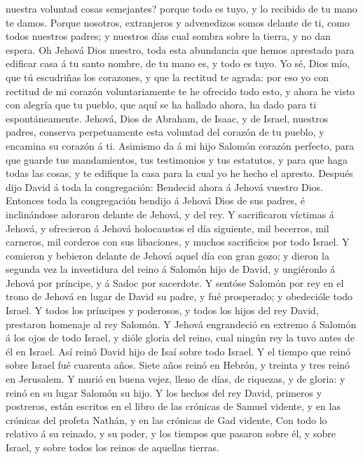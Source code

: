 nuestra voluntad cosas semejantes? porque todo es tuyo, y lo recibido de
tu mano te damos.  Porque nosotros, extranjeros y
advenedizos somos delante de ti, como todos nuestros padres; y nuestros
días cual sombra sobre la tierra, y no dan espera.  Oh
Jehová Dios nuestro, toda esta abundancia que hemos aprestado para
edificar casa á tu santo nombre, de tu mano es, y todo es tuyo.
 Yo sé, Dios mío, que tú escudriñas los corazones, y que
la rectitud te agrada: por eso yo con rectitud de mi corazón
voluntariamente te he ofrecido todo esto, y ahora he visto con alegría
que tu pueblo, que aquí se ha hallado ahora, ha dado para ti
espontáneamente.  Jehová, Dios de Abraham, de Isaac, y de
Israel, nuestros padres, conserva perpetuamente esta voluntad del
corazón de tu pueblo, y encamina su corazón á ti. 
Asimismo da á mi hijo Salomón corazón perfecto, para que guarde tus
mandamientos, tus testimonios y tus estatutos, y para que haga todas las
cosas, y te edifique la casa para la cual yo he hecho el apresto.
 Después dijo David á toda la congregación: Bendecid
ahora á Jehová vuestro Dios. Entonces toda la congregación bendijo á
Jehová Dios de sus padres, é inclinándose adoraron delante de Jehová, y
del rey.  Y sacrificaron víctimas á Jehová, y ofrecieron
á Jehová holocaustos el día siguiente, mil becerros, mil carneros, mil
corderos con sus libaciones, y muchos sacrificios por todo Israel.
 Y comieron y bebieron delante de Jehová aquel día con
gran gozo; y dieron la segunda vez la investidura del reino á Salomón
hijo de David, y ungiéronlo á Jehová por príncipe, y á Sadoc por
sacerdote.  Y sentóse Salomón por rey en el trono de
Jehová en lugar de David su padre, y fué prosperado; y obedecióle todo
Israel.  Y todos los príncipes y poderosos, y todos los
hijos del rey David, prestaron homenaje al rey Salomón. 
Y Jehová engrandeció en extremo á Salomón á los ojos de todo Israel, y
dióle gloria del reino, cual ningún rey la tuvo antes de él en Israel.
 Así reinó David hijo de Isaí sobre todo Israel.
 Y el tiempo que reinó sobre Israel fué cuarenta años.
Siete años reinó en Hebrón, y treinta y tres reinó en Jerusalem.
 Y murió en buena vejez, lleno de días, de riquezas, y de
gloria: y reinó en su lugar Salomón su hijo.  Y los
hechos del rey David, primeros y postreros, están escritos en el libro
de las crónicas de Samuel vidente, y en las crónicas del profeta Nathán,
y en las crónicas de Gad vidente,  Con todo lo relativo á
su reinado, y su poder, y los tiempos que pasaron sobre él, y sobre
Israel, y sobre todos los reinos de aquellas tierras.
